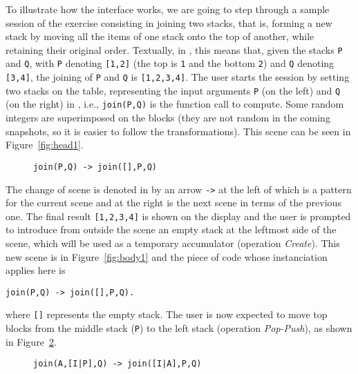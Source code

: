 To illustrate how the interface works, we are going to step through a
sample session of the exercise consisting in joining two stacks, that
is, forming a new stack by moving all the items of one stack onto the
top of another, while retaining their original order. Textually, in
\erlang, this means that, given the stacks \texttt{P} and \texttt{Q},
with \texttt{P} denoting \texttt{[1,2]} (the top is \texttt{1} and the
bottom \texttt{2}) and \texttt{Q} denoting \texttt{[3,4]}, the joining
of \texttt{P} and \texttt{Q} is \texttt{[1,2,3,4]}. The user starts
the session by setting two stacks on the table, representing the input
arguments \texttt{P} (on the left) and \texttt{Q} (on the right) in
\erlang, i.e., \texttt{join(P,Q)} is the function call to
compute. Some random integers are superimposed on the blocks (they are
not random in the coming snapshots, so it is easier to follow the
transformations). This scene can be seen in
Figure~\ref{fig:head1}. 
\begin{figure}[!h]
\centering
{}
\quad
{}
\caption{\texttt{\small join(P,Q) -> join([],P,Q)}
\label{fig:clause1}}
\end{figure}
The change of scene is denoted in \erlang by an arrow \texttt{->} at
the left of which is a pattern for the current scene and at the right
is the next scene in terms of the previous one. The final result
\texttt{[1,2,3,4]} is shown on the display and the user is prompted to
introduce from outside the scene an empty stack at the leftmost side
of the scene, which will be used as a temporary accumulator (operation
\textsl{Create}). This new scene is in Figure~\ref{fig:body1} and the
\erlang piece of code whose instanciation applies here is {\small
\begin{verbatim}
join(P,Q) -> join([],P,Q).
\end{verbatim}
}
\noindent 
where \texttt{[]} represents the empty stack. The user is now expected
to move top blocks from the middle stack (\texttt{P}) to the left
stack (operation \textsl{Pop\hyp{}Push}), as shown in
Figure~\ref{fig:clause2}.
\begin{figure}[!h]
\centering
{}
\quad
{}
\caption{\texttt{\small join(A,[I|P],Q) -> join([I|A],P,Q)}
\label{fig:clause2}}
\end{figure}
